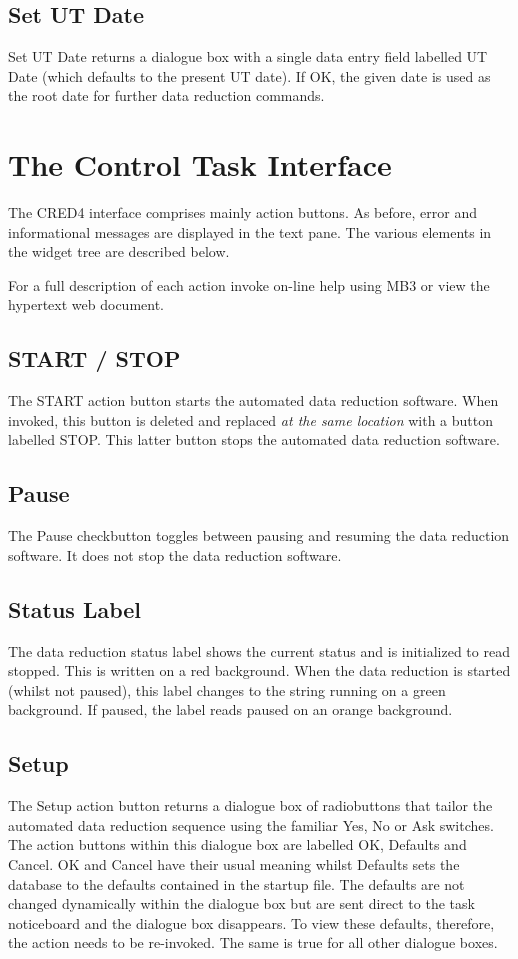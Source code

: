 \documentclass[a4paper]{book}
\renewcommand{\_}{{\tt\char'137}}
\begin{document}
\subsection{Set UT Date}
{\sf Set UT Date} returns a dialogue box with a single data entry field labelled {\sf UT Date}
(which defaults to the present UT date). If {\sf OK}, the given date is used as the root
date for further data reduction commands.

\section{The Control Task Interface}
The CRED4 interface comprises mainly action buttons.
As before, error and informational messages are displayed in the text pane.
The various elements in the widget tree are described below.

For a full description of each action invoke on-line help using MB3 or view the hypertext web document.

\subsection{START / STOP}
The {\sf START} action button starts the
automated data reduction software. When invoked, this button is deleted and replaced
{\em at the same location} with a button labelled {\sf STOP}. This latter
button stops the automated data reduction software.

\subsection{Pause}
The {\sf Pause} checkbutton toggles between pausing and resuming the
data reduction software. It does not stop the data reduction software.

\subsection{Status Label}
The data reduction status label shows the current status and is initialized to read
{\sc stopped}. This is written on a red background. When the data reduction is started (whilst not paused), this
label changes to the string {\sc running} on a green background. If paused, the label reads {\sc paused} on an
orange background.

\subsection{Setup}
The {\sf Setup} action button returns a dialogue box of radiobuttons that tailor the automated data
reduction sequence using the familiar {\sf Yes}, {\sf No} or {\sf Ask} switches. The action buttons within this dialogue
box are labelled {\sf OK}, {\sf Defaults} and {\sf Cancel}.
{\sf OK} and {\sf Cancel} have their usual meaning whilst {\sf Defaults} sets the database to the defaults contained
in the startup file. The defaults are not changed dynamically within the dialogue box but
are sent direct to the task noticeboard and the dialogue box disappears. To view these defaults,
therefore, the action needs to be re-invoked. The same is true for all other dialogue boxes.
\end{document}

